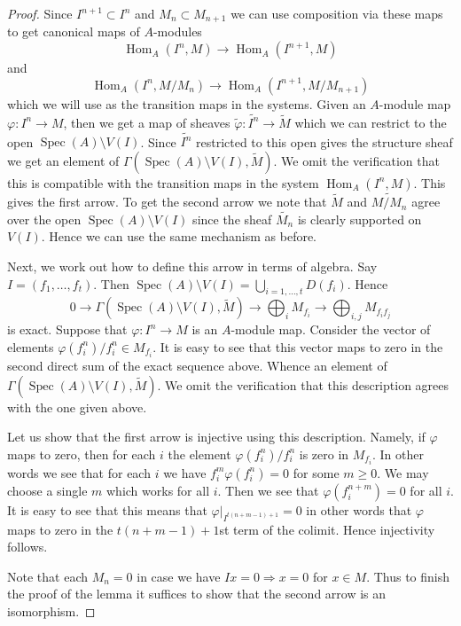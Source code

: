 \documentclass{stacks-project}
\theoremstyle{plain}
\theoremstyle{definition}
\theoremstyle{remark}
\numberwithin{equation}{subsection}
\def\Spec{\mathop{\mathrm{Spec}}}
\def\Hom{\mathop{\mathrm{Hom}}\nolimits}
\begin{document}
\begin{proof}
Since $I^{n + 1} \subset I^n$ and $M_n \subset M_{n + 1}$ we can
use composition via these maps to get canonical maps of $A$-modules
$$
\Hom_A(I^n, M)
\longrightarrow
\Hom_A(I^{n + 1}, M)
$$
and
$$
\Hom_A(I^n, M/M_n)
\longrightarrow
\Hom_A(I^{n + 1}, M/M_{n + 1})
$$
which we will use as the transition maps in the systems. Given an
$A$-module map $\varphi : I^n \to M$, then we get a map of
sheaves $\widetilde{\varphi} : \widetilde{I^n} \to \widetilde{M}$
which we can restrict to the open $\Spec(A) \setminus V(I)$.
Since $\widetilde{I^n}$ restricted to this open gives the structure
sheaf we get an element of
$\Gamma(\Spec(A) \setminus V(I), \widetilde{M})$.
We omit the verification that this is compatible with the transition maps
in the system $\Hom_A(I^n, M)$. This gives the first arrow.
To get the second arrow we note that
$\widetilde{M}$ and $\widetilde{M/M_n}$ agree over the open
$\Spec(A) \setminus V(I)$ since the sheaf $\widetilde{M_n}$
is clearly supported on $V(I)$. Hence we can use the same mechanism
as before.

\medskip\noindent
Next, we work out how to define this arrow in terms of algebra.
Say $I = (f_1, \ldots, f_t)$. Then
$\Spec(A) \setminus V(I) = \bigcup_{i = 1, \ldots, t} D(f_i)$.
Hence
$$
0 \to
\Gamma(\Spec(A) \setminus V(I), \widetilde{M}) \to
\bigoplus\nolimits_i M_{f_i} \to
\bigoplus\nolimits_{i, j} M_{f_if_j}
$$
is exact. Suppose that $\varphi : I^n \to M$ is an $A$-module map.
Consider the vector of elements $\varphi(f_i^n)/f_i^n \in M_{f_i}$.
It is easy to see that this vector maps to zero in the
second direct sum of the exact sequence above. Whence an element
of $\Gamma(\Spec(A) \setminus V(I), \widetilde{M})$.
We omit the verification that this description agrees with the one
given above.

\medskip\noindent
Let us show that the first arrow is injective using this description.
Namely, if $\varphi$ maps to zero, then for each $i$ the element
$\varphi(f_i^n)/f_i^n$ is zero in $M_{f_i}$. In other words we
see that for each $i$ we have $f_i^m\varphi(f_i^n) = 0$ for some $m \geq 0$.
We may choose a single $m$ which works for all $i$. Then we see that
$\varphi(f_i^{n + m}) = 0$ for all $i$. It is easy to see that
this means that $\varphi|_{I^{t(n + m - 1) + 1}} = 0$ in other
words that $\varphi$ maps to zero in the $t(n + m - 1) + 1$st
term of the colimit. Hence injectivity follows.

\medskip\noindent
Note that each $M_n = 0$ in case we have
$Ix = 0 \Rightarrow x = 0$ for $x \in M$. Thus
to finish the proof of the lemma it suffices to show that
the second arrow is an isomorphism.


\end{proof}
\end{document}
